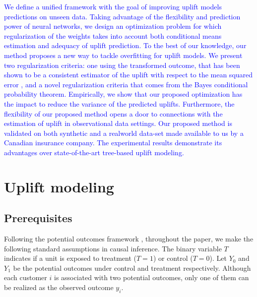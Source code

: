 \documentclass{article}
\def\X{\mathbf X}
\begin{document}
\textcolor{blue}{We define a unified framework with the goal of improving uplift models predictions on unseen data. Taking advantage of the flexibility and prediction power of neural networks, we design an optimization problem for which regularization of the weights takes into account both conditional means estimation and adequacy of uplift prediction. To the best of our knowledge, our method proposes a new way to tackle overfitting for uplift models. We present two regularization criteria: one using the transformed outcome, that has been shown to be a consistent estimator of the uplift with respect to the mean squared error \citep{gutierrez2017causal}, and a novel regularization criteria that comes from the Bayes conditional probability theorem. 
Empirically, we show that our proposed optimization has the impact to reduce the variance of the predicted uplifts. Furthermore, the flexibility of our proposed method opens a door to connections with the estimation of uplift in observational data settings. Our proposed method is validated on both synthetic and a realworld data-set made available to us by a Canadian insurance company. The experimental results demonstrate its advantages over state-of-the-art tree-based uplift modeling.}


\section{Uplift modeling}
\label{sec:literature}

\subsection{Prerequisites}

Following the potential outcomes framework \citep{holland1986statistics}, throughout the paper, we make the following standard assumptions in causal inference. The binary variable $T$ indicates if a unit is exposed to treatment ($T=1$) or control ($T=0$). Let $Y_0$  and $Y_1$ be the potential outcomes under control and treatment respectively. Although each customer $i$ is associated with two potential outcomes, only one of them can be realized as the observed outcome $y_i$. 
\end{document}
